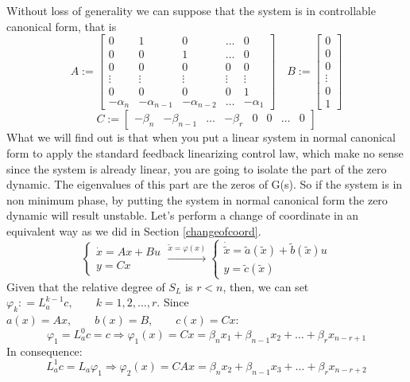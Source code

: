 Without loss of generality we can suppose that the system is in controllable canonical form, that is
\begin{equation*}
A:=\begin{bmatrix}
	0 & 1 & 0 & \dots & 0 \\
	0 & 0 & 1 &  \dots & 0 \\
	0 & 0 & 0 & 0 & 0 \\
	\vdots& \vdots & \vdots & \vdots & \vdots \\
	0& 0 & 0 & 0 & 1 \\
	-\alpha_n &-\alpha_{n-1} & -\alpha_{n-2} & \dots & -\alpha_1 
\end{bmatrix}\quad 
B:=\begin{bmatrix}
0	\\
0	\\
0	\\
\vdots\\
	0\\
	1
\end{bmatrix}
\end{equation*}
\[C:=\begin{bmatrix}
	-\beta_n&-\beta_{n-1}  & \dots &-\beta_r  & 0 &0  & \dots & 0 
\end{bmatrix}
\]
What we will find out is that when you put a linear system in normal canonical form to apply the standard feedback linearizing control law, which make no sense since the system is already linear, you are going to isolate the part of the zero dynamic. The eigenvalues of this part are the zeros of G(s). So if the system is in non minimum phase, by putting the system in normal canonical form the zero dynamic will result unstable.
Let's perform a change of coordinate in an equivalent way as we did in Section \ref{changeofcoord}.
\[
\begin{cases}
	\dot{x}=Ax+Bu\\
	y=Cx
\end{cases} \xrightarrow{\tilde{x}=\varphi(x)}
\begin{cases}
	\dot{\tilde{x}}=\tilde{a}(\tilde{x})+\tilde{b}(\tilde{x})u\\
	y=\tilde{c}(\tilde{x})
\end{cases} 
\]
Given that the relative degree of $S_L$ is $r<n$, then, we can set $\varphi_k\colon=L_a^{k-1}c,\qquad k=1,2,\dots,r$. Since $a(x)=Ax,	\qquad b(x)=B,\qquad c(x)=Cx$:	\[
\varphi_1=L_a^0c=c \Rightarrow 	\varphi_1(x)=Cx=\beta_nx_1+\beta_{n-1}x_2+\dots+\beta_rx_{n-r+1}
\] In consequence:\[
L_a^1c=L_a\varphi_1 \Rightarrow \varphi_2(x)=CAx=\beta_nx_2+\beta_{n-1}x_3+\dots+\beta_rx_{n-r+2}
\]
